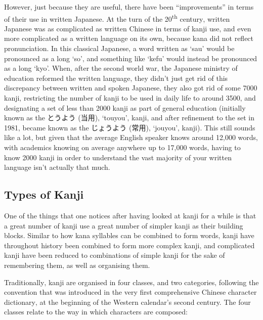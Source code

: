 \documentclass[11pt, b5paper, twoside, openright, onecolumn]{book}
\makeatletter
\newcommand*{\rubystack}[2]{{\relscale{0.5}%
  \begin{tabular}[b]{@{}c@{}}%
    {#1}\\%
   {\textscale{2}{#2}}%
  \end{tabular}}%
}
\DeclareRobustCommand*{\ruby}[2]{%
  \mbox{%
    \setlength{\parskip}{0ex}%
    \BeginAccSupp{method=pdfstringdef,ActualText={#1}}%
      \rubystack{\phantom{#2}}{#1}%
      \llap{%
        \rubystack{#2}{\phantom{#1}}%
      }%
    \EndAccSupp{}%
  }%
}
\renewcommand*{\ruby}[2]{#2 (#1)}%
\makeatother
\begin{document}
However‚ just because they are useful‚ there have been “improvements” in terms of their use in written Japanese. At the turn of the 20\textsuperscript{th} century‚ written Japanese was as complicated as written Chinese in terms of kanji use‚ and even more complicated as a written language on its own‚ because kana did not reflect pronunciation. In this classical Japanese‚ a word written as ‘sau’ would be pronounced as a long ‘so’‚ and something like ‘kefu’ would instead be pronounced as a long ‘kyo’. When‚ after the second world war‚ the Japanese ministry of education reformed the written language‚ they didn’t just get rid of this discrepancy between written and spoken Japanese‚ they also got rid of some 7000 kanji‚ restricting the number of kanji to be used in daily life to around 3500‚ and designating a set of less than 2000 kanji as part of general education (initially known as the \ruby{当用}{とうよう}‚ ‘touyou’‚ kanji‚ and after refinement to the set in 1981‚ became known as the \ruby{常用}{じょうよう}‚ ‘jouyou’‚ kanji). This still sounds like a lot‚ but given that the average English speaker knows around 12‚000 words‚ with academics knowing on average anywhere up to 17‚000 words‚ having to know 2000 kanji in order to understand the vast majority of your written language isn’t actually that much.

\subsection{Types of Kanji}

One of the things that one notices after having looked at kanji for a while is that a great number of kanji use a great number of simpler kanji as their building blocks. Similar to how kana syllables can be combined to form words‚ kanji have throughout history been combined to form more complex kanji‚ and complicated kanji have been reduced to combinations of simple kanji for the sake of remembering them‚ as well as organising them.

Traditionally‚ kanji are organised in four classes‚ and two categories‚ following the convention that was introduced in the very first comprehensive Chinese character dictionary‚ at the beginning of the Western calendar’s second century. The four classes relate to the way in which characters are composed:
\end{document}
